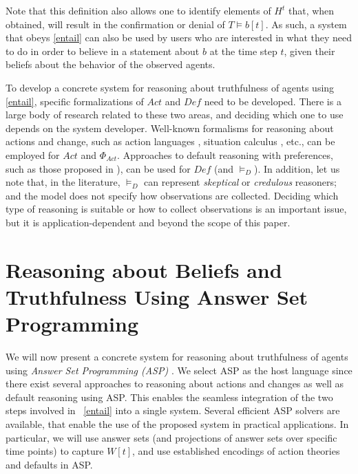 \documentclass{article}
\begin{document}
Note that this definition also allows one to identify elements of $H^t$ that, when obtained, will result in the 
confirmation or denial of $T \models b[t]$. As such, a system that obeys \eqref{entail} can also be used by users who are 
interested in  what they need to do in order to believe in a statement about $b$ at the time step $t$,
 given their beliefs about the behavior of the observed agents. 


%

%
To develop a concrete system for reasoning about truthfulness of agents using \eqref{entail}, specific formalizations of $Act$ and $\textit{Def}$ need to be developed. There is a large body of research related to these two areas, and deciding which one to use depends on the system developer. 
Well-known formalisms for reasoning about actions and change, such as action languages \cite{GelfondL98}, situation calculus \cite{Reiter01}, etc., can be employed for $Act$ and $\Phi_{Act}$.  
Approaches to default reasoning with preferences, such as those proposed in  \cite{brew99,BrewkaE00,DelgrandeST03,GelfondS98}), can be used for $\textit{Def}$ (and $\models_D$). In addition, 
let us note that, in the literature, $\models_D$ can represent \emph{skeptical} or \emph{credulous} reasoners; and  the model does not specify how observations are collected. Deciding which type of reasoning is suitable or how to collect observations is an important issue, but it is application-dependent and beyond  the scope of this paper. 
%



\section{Reasoning about Beliefs and Truthfulness Using Answer Set Programming}  

We will now present a concrete system for reasoning about truthfulness of agents using \emph{Answer Set Programming (ASP)} \cite{MarekT99,GelfondL91}.  We select ASP as the host language since there exist several approaches to reasoning about actions and changes as well as default reasoning using ASP. This enables  the seamless integration of the two steps involved in ~\eqref{entail} into a single system. 
Several efficient ASP solvers are available, that enable the use of the proposed system in practical applications. In particular, we will use answer sets (and projections of answer sets over specific time points) to capture $W[t]$, and use established encodings of action theories and defaults in ASP.
  
\end{document}
